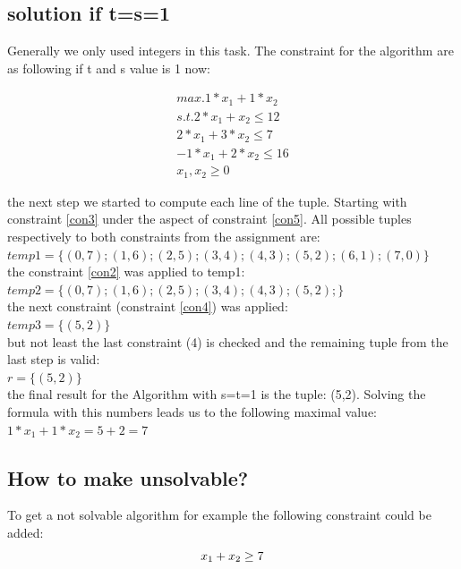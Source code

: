 \documentclass[%
   10pt,              %
   nenglish,           %
   a4paper,           %
   DIV11,             %
]{scrartcl}%
\begin{document}
\subsection*{solution if t=s=1}
Generally we only used integers in this task. The constraint for the algorithm are as following if t and s value is 1 now:

\begin{eqnarray}
max. 1*x_1+1*x_2 \label{con1}\\ 
s.t. 2*x_1+x_2 \le 12 \label{con2}\\ 
2*x_1+3*x_2 \le 7 \label{con3}\\ 
-1*x_1+2*x_2 \le 16 \label{con4}\\ 
x_1,x_2 \ge 0 \label{con5}
\end{eqnarray}

\noindent the next step we started to compute each line of the tuple. Starting with constraint \ref{con3} under the aspect of constraint \ref{con5}. All possible tuples respectively to both constraints from the assignment are:\\
$temp1=\{(0,7);(1,6);(2,5);(3,4);(4,3);(5,2);(6,1);(7,0)\}$\\

\noindent the constraint \ref{con2} was applied to temp1:\\
$temp2=\{(0,7);(1,6);(2,5);(3,4);(4,3);(5,2);\}$\\

\noindent the next constraint (constraint \ref{con4}) was applied:\\
$temp3=\{(5,2)\}$\\

\noindent but not least the last constraint (4) is checked and the remaining tuple from the last step is valid:\\
$r=\{(5,2)\}$\\

\noindent the final result for the Algorithm with s=t=1 is the tuple: (5,2). Solving the formula with this numbers 
leads us to the following maximal value: $1*x_1 + 1*x_2 = 5+2 = 7$\\


\subsection*{How to make unsolvable?}
To get a not solvable algorithm for example the following constraint could be added:
	\begin{equation}\\
		x_1+x_2\ge 7
	\end{equation}
\end{document}
